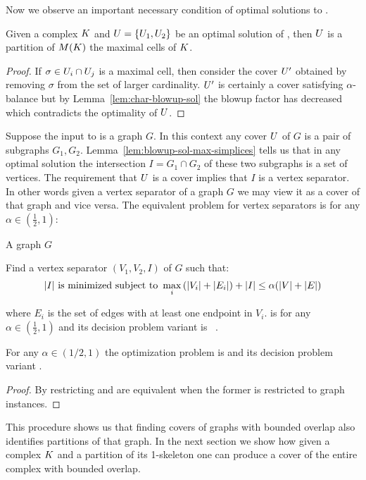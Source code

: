 \noindent Now we observe an important necessary condition of optimal solutions to \ablp{}.
\begin{lemma}
\label{lem:blowup-sol-max-simplices}
Given a complex $K$ and $U = \{U_1, U_2\}$ be an optimal solution of  \ablp{}, then 
$U$ is a partition of $M(K)$ the maximal cells of $K$.
\end{lemma}
\begin{proof}
If $\sigma \in U_i \cap U_j$ is a maximal cell, then consider the cover
$U'$ obtained by removing $\sigma$ from the set of larger
cardinality. $U'$ is certainly a cover satisfying $\alpha$-balance but
by Lemma~\ref{lem:char-blowup-sol} the blowup factor has decreased
which contradicts the optimality of $U$.
\end{proof}
\noindent Suppose the input to \ablp{} is a graph $G$. In this context any cover $U$ of $G$ is a pair of subgraphs $G_1,G_2$.
Lemma~\ref{lem:blowup-sol-max-simplices} tells us that in any optimal solution the intersection $I = G_1 \cap G_2$ of these two 
subgraphs is a set of vertices. The requirement that $U$ is a cover implies that $I$ is a vertex separator. In other words
given a vertex separator of a graph $G$ we may view it as a cover of that graph and vice versa. 
The equivalent problem for vertex separators is for any $\alpha \in (\frac{1}{2},1)$:
\begin{description}
\addtolength{\itemsep}{-.8\baselineskip}
\item[\textsc{Problem:}]  \avertex{}
\item[\textsc{Instance:}] A graph $G$
\item[\textsc{Goal:}] Find a vertex separator $(V_1,V_2,I)$ of $G$ such that: 
\[ |I| \textrm{ is minimized} \textrm{ subject to } \max_i{(|V_i| + |E_i|)} + |I| \leq \alpha(|V|+|E|)  \]
\end{description}
where $E_i$ is the set of edges with at least one endpoint in $V_i$. \avertex{} is \NPH{} for any $\alpha \in (\frac{1}{2},1)$ and its decision problem variant is \NPC{}~\cite{rhl-yaggpis-14}.
\begin{theorem}
For any $\alpha \in (1/2,1)$ the optimization problem \ablp{} is \NPH{} and its decision problem variant \NPC{}.
\end{theorem}
\begin{proof}
By restricting \ablp{} and \avertex{} are equivalent when the former is restricted to graph instances.
\end{proof}
This procedure shows us that finding covers of graphs with bounded overlap also identifies partitions of that graph.
In the next section we show how given a complex $K$ and a partition of its 1-skeleton one can produce a cover of the entire complex with bounded overlap.
